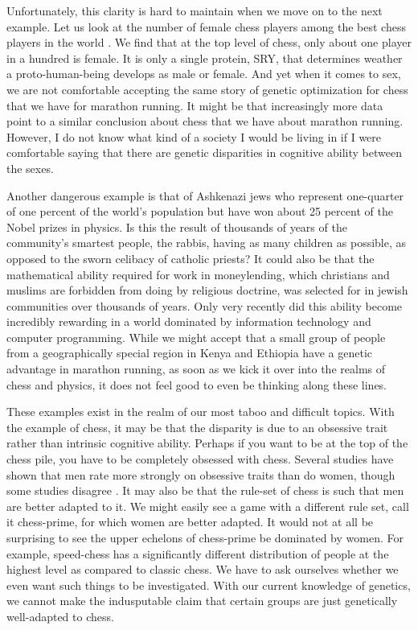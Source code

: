 Unfortunately, this clarity is hard to maintain when we move on to the next example.
Let us look at the number of female chess players among the best chess players in the world \cite{chess2020}.
We find that at the top level of chess, only about one player in a hundred is female.
It is only a single protein, SRY, that determines weather a proto-human-being develops as male or female.
And yet when it comes to sex, we are not comfortable accepting the same story of genetic optimization for chess that we have for marathon running.
It might be that increasingly more data point to a similar conclusion about chess that we have about marathon running.
However, I do not know what kind of a society I would be living in if I were comfortable saying that there are genetic disparities in cognitive ability between the sexes.

Another dangerous example is that of Ashkenazi jews who represent one-quarter of one percent of the world's population but have won about 25 percent of the Nobel prizes in physics.
Is this the result of thousands of years of the community's smartest people, the rabbis, having as many children as possible, as opposed to the sworn celibacy of catholic priests?
It could also be that the mathematical ability required for work in moneylending, which christians and muslims are forbidden from doing by religious doctrine, was selected for in jewish communities over thousands of years.
Only very recently did this ability become incredibly rewarding in a world dominated by information technology and computer programming.
While we might accept that a small group of people from a geographically special region in Kenya and Ethiopia have a genetic advantage in marathon running, as soon as we kick it over into the realms of chess and physics, it does not feel good to even be thinking along these lines.

These examples exist in the realm of our most taboo and difficult topics.
With the example of chess, it may be that the disparity is due to an obsessive trait rather than intrinsic cognitive ability.
Perhaps if you want to be at the top of the chess pile, you have to be completely obsessed with chess.
Several studies have shown that men rate more strongly on obsessive traits than do women, though some studies disagree \cite{Mathis2011}.
It may also be that the rule-set of chess is such that men are better adapted to it.
We might easily see a game with a different rule set, call it chess-prime, for which women are better adapted.
It would not at all be surprising to see the upper echelons of chess-prime be dominated by women.
For example, speed-chess has a significantly different distribution of people at the highest level as compared to classic chess.
We have to ask ourselves whether we even want such things to be investigated.
With our current knowledge of genetics, we cannot make the indusputable claim that certain groups are just genetically well-adapted to chess.

